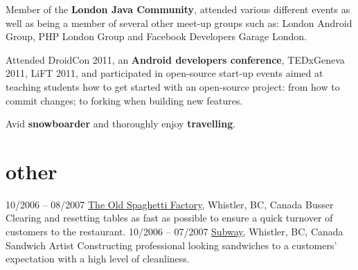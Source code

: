\documentclass[]{friggeri-cv}
\begin{document}
Member of the \textbf{London Java Community}, attended various different events as well as being a member of several other meet-up groups such as: London Android Group, PHP London Group and Facebook Developers Garage London.

Attended DroidCon 2011, an \textbf{Android developers conference}, TEDxGeneva 2011, LiFT 2011, and participated in open-source start-up events aimed at teaching students how to get started with an open-source project: from how to commit changes; to forking when building new features.

Avid \textbf{snowboarder} and thoroughly enjoy \textbf{travelling}.

\section{other}

\begin{entrylist}
  \entry
    {10/2006 – 08/2007}
    {\href{http://theoldspaghettifactory.ca}{The Old Spaghetti Factory}, Whistler, BC, Canada}
    {Busser}
    {Clearing and resetting tables as fast as possible to ensure a quick turnover of customers to the restaurant.}
  \entry
    {10/2006 – 07/2007}
    {\href{http://subway.com}{Subway}, Whistler, BC, Canada}
    {Sandwich Artist}
    {Constructing professional looking sandwiches to a customers' expectation with a high level of cleanliness.}
\end{entrylist}
\end{document}
